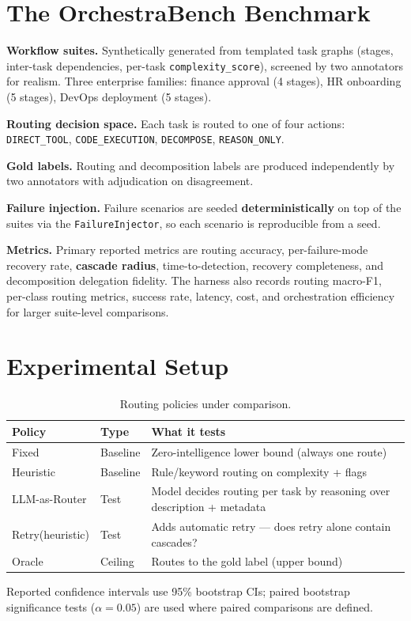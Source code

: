 \documentclass[sigconf,nonacm,anonymous]{acmart}  %
\begin{document}
\section{The OrchestraBench Benchmark}
\textbf{Workflow suites.} Synthetically generated from templated task graphs
(stages, inter-task dependencies, per-task \texttt{complexity\_score}), screened
by two annotators for realism. Three enterprise families: finance approval
(4 stages), HR onboarding (5 stages), DevOps deployment (5 stages).

\textbf{Routing decision space.} Each task is routed to one of four actions:
\texttt{DIRECT\_TOOL}, \texttt{CODE\_EXECUTION}, \texttt{DECOMPOSE},
\texttt{REASON\_ONLY}.

\textbf{Gold labels.} Routing and decomposition labels are produced
independently by two annotators with adjudication on disagreement.

\textbf{Failure injection.} Failure scenarios are seeded \textbf{deterministically}
on top of the suites via the \texttt{FailureInjector}, so each scenario is
reproducible from a seed.

\textbf{Metrics.} Primary reported metrics are routing accuracy,
per-failure-mode recovery rate, \textbf{cascade radius}, time-to-detection,
recovery completeness, and decomposition delegation fidelity. The harness also
records routing macro-F1, per-class routing metrics, success rate, latency, cost,
and orchestration efficiency for larger suite-level comparisons.

\section{Experimental Setup}
\label{sec:setup}
\begin{table}[t]
\centering
\caption{Routing policies under comparison.}
\label{tab:policies}
\small
\begin{tabular}{@{}llp{3.4cm}@{}}
\toprule
\textbf{Policy} & \textbf{Type} & \textbf{What it tests} \\
\midrule
Fixed & Baseline & Zero-intelligence lower bound (always one route) \\
Heuristic & Baseline & Rule/keyword routing on complexity + flags \\
LLM-as-Router & Test & Model decides routing per task by reasoning over
description + metadata \\
Retry(heuristic) & Test & Adds automatic retry --- does retry alone contain
cascades? \\
Oracle & Ceiling & Routes to the gold label (upper bound) \\
\bottomrule
\end{tabular}
\end{table}
Reported confidence intervals use 95\% bootstrap CIs; paired bootstrap
significance tests ($\alpha = 0.05$) are used where paired comparisons are
defined.
\end{document}
